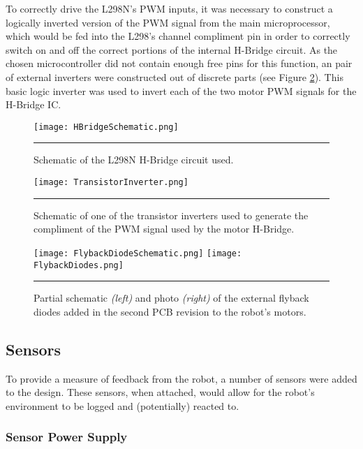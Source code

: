 To correctly drive the L298N's PWM inputs, it was necessary to construct a logically inverted version of the PWM signal from the main microprocessor, which would be fed into the L298's channel compliment pin in order to correctly switch on and off the correct portions of the internal H-Bridge circuit. As the chosen microcontroller did not contain enough free pins for this function, an pair of external inverters were constructed out of discrete parts (see Figure \ref{fig:transistorinverter}). This basic logic inverter was used to invert each of the two motor PWM signals for the H-Bridge IC.

\begin{figure}[tbph]
	\centering
		\texttt{[image: HBridgeSchematic.png]}
	\rule{35em}{0.5pt}
	\caption[Motor H-Bridge Schematic]{Schematic of the L298N H-Bridge circuit used.}
	\label{fig:hbridge}
\end{figure}

\begin{figure}[tbph]
	\centering
		\texttt{[image: TransistorInverter.png]}
	\rule{35em}{0.5pt}
	\caption[Transistor Inverter Schematic]{Schematic of one of the transistor inverters used to generate the compliment of the PWM signal used by the motor H-Bridge.}
	\label{fig:transistorinverter}
\end{figure}

\begin{figure}[tbph]
	\centering
		\texttt{[image: FlybackDiodeSchematic.png]}
		\texttt{[image: FlybackDiodes.png]}
	\rule{35em}{0.5pt}
	\caption[Motor Flyback Diodes]{Partial schematic \textit{(left)} and photo \textit{(right)} of the external flyback diodes added in the second PCB revision to the robot's motors.}
	\label{fig:flybackdiodes}
\end{figure}

\FloatBarrier
\subsection{Sensors}

To provide a measure of feedback from the robot, a number of sensors were added to the design. These sensors, when attached, would allow for the robot's environment to be logged and (potentially) reacted to.

\FloatBarrier
\subsubsection{Sensor Power Supply}

